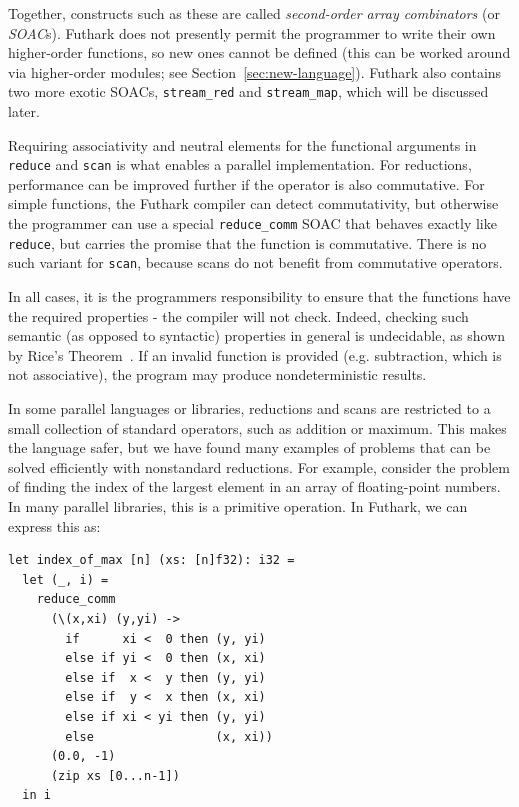 Together, constructs such as these are called \textit{second-order
  array combinators} (or \textit{SOAC}s).  Futhark does not presently
permit the programmer to write their own higher-order functions, so
new ones cannot be defined (this can be worked around via higher-order
modules; see Section~\ref{sec:new-language}).  Futhark also contains
two more exotic SOACs, \lstinline{stream_red} and
\lstinline{stream_map}, which will be discussed later.

Requiring associativity and neutral elements for the functional
arguments in \lstinline{reduce} and \lstinline{scan} is what enables a
parallel implementation.  For reductions, performance can be improved
further if the operator is also commutative.  For
simple functions, the Futhark compiler can detect commutativity, but
otherwise the programmer can use a special \lstinline{reduce_comm}
SOAC that behaves exactly like \lstinline{reduce}, but carries the
promise that the function is commutative.  There is no such variant
for \lstinline{scan}, because scans do not benefit from commutative
operators.

In all cases, it is the programmers responsibility to ensure that the
functions have the required properties - the compiler will not check.
Indeed, checking such semantic (as opposed to syntactic) properties in
general is undecidable, as shown by Rice's
Theorem~\cite{10.2307/1990888}.  If an invalid function is provided
(e.g. subtraction, which is not associative), the program may produce
nondeterministic results.

In some parallel languages or libraries, reductions and scans are
restricted to a small collection of standard operators, such as
addition or maximum.  This makes the language safer, but we have found
many examples of problems that can be solved efficiently with
nonstandard reductions.  For example, consider the problem of finding
the index of the largest element in an array of floating-point
numbers.  In many parallel libraries, this is a primitive operation.
In Futhark, we can express this as:

\begin{lstlisting}
let index_of_max [n] (xs: [n]f32): i32 =
  let (_, i) =
    reduce_comm
      (\(x,xi) (y,yi) ->
        if      xi <  0 then (y, yi)
        else if yi <  0 then (x, xi)
        else if  x <  y then (y, yi)
        else if  y <  x then (x, xi)
        else if xi < yi then (y, yi)
        else                 (x, xi))
      (0.0, -1)
      (zip xs [0...n-1])
  in i
\end{lstlisting}

